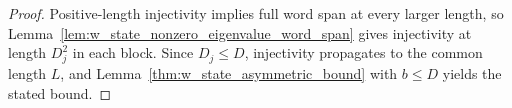 \begin{proof}
    \leanok
    Positive-length injectivity implies full word span at every larger length,
    so Lemma~\ref{lem:w_state_nonzero_eigenvalue_word_span} gives injectivity
    at length $D_j^2$ in each block. Since $D_j\le D$, injectivity propagates
    to the common length $L$, and Lemma~\ref{thm:w_state_asymmetric_bound}
    with $b\le D$ yields the stated bound.
\end{proof}
